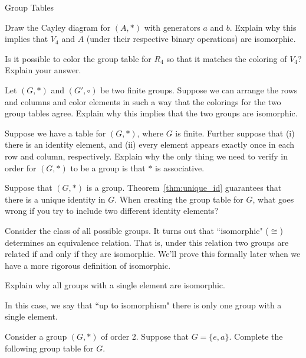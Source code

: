 \begin{section}{Group Tables}
\begin{exercise}
Draw the Cayley diagram for $(A,*)$ with generators $a$ and $b$.  Explain why this implies that $V_4$ and $A$ (under their respective binary operations) are isomorphic.  
\end{exercise}

\begin{exercise}
Is it possible to color the group table for $R_4$ so that it matches the coloring of $V_4$?  Explain your answer.
\end{exercise}

\begin{problem}\label{prob:iso_same_group_table}
Let $(G,*)$ and $(G',\circ)$ be two finite groups.  Suppose we can arrange the rows and columns and color elements in such a way that the colorings for the two group tables agree.  Explain why this implies that the two groups are isomorphic.
\end{problem}

\begin{problem}
Suppose we have a table for $(G,*)$, where $G$ is finite.  Further suppose that (i) there is an identity element, and (ii) every element appears exactly once in each row and column, respectively.  Explain why the only thing we need to verify in order for $(G,*)$ to be a group is that $*$ is associative.
\end{problem}

\begin{problem}%
Suppose that $(G,*)$ is a group.  Theorem~\ref{thm:unique_id} guarantees that there is a unique identity in $G$.  When creating the group table for $G$, what goes wrong if you try to include two different identity elements?
\end{problem}

Consider the class of all possible groups.  It turns out that ``isomorphic" ($\cong$) determines an equivalence relation.  That is, under this relation two groups are related if and only if they are isomorphic.  We'll prove this formally later when we have a more rigorous definition of isomorphic.

\begin{problem}
Explain why all groups with a single element are isomorphic.
\end{problem}

In this case, we say that ``up to isomorphism" there is only one group with a single element.

\begin{problem}
Consider a group $(G,*)$ of order 2.  Suppose that $G=\{e,a\}$.  Complete the following group table for $G$.


\end{problem}
\end{section}
